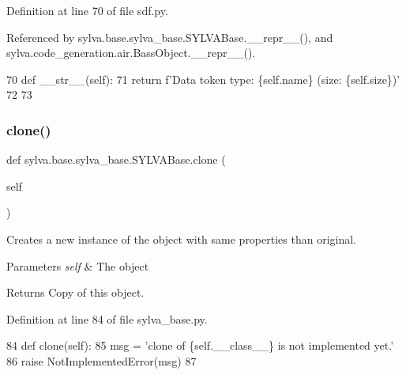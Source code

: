 Definition at line 70 of file sdf.\+py.



Referenced by sylva.\+base.\+sylva\+\_\+base.\+S\+Y\+L\+V\+A\+Base.\+\_\+\+\_\+repr\+\_\+\+\_\+(), and sylva.\+code\+\_\+generation.\+air.\+Bass\+Object.\+\_\+\+\_\+repr\+\_\+\+\_\+().


\begin{DoxyCode}
70     \textcolor{keyword}{def }\_\_str\_\_(self):
71         \textcolor{keywordflow}{return} f\textcolor{stringliteral}{'Data token type: \{self.name\} (size: \{self.size\})'}
72 
73 
\end{DoxyCode}
\mbox{\label{classsylva_1_1base_1_1sylva__base_1_1_s_y_l_v_a_base_a1597b4594cb73e0fa2597742239660f5}} 
\subsubsection{\texorpdfstring{clone()}{clone()}}
{\footnotesize\ttfamily def sylva.\+base.\+sylva\+\_\+base.\+S\+Y\+L\+V\+A\+Base.\+clone (\begin{DoxyParamCaption}\item[{}]{self }\end{DoxyParamCaption})\hspace{0.3cm}{\ttfamily [inherited]}}



Creates a new instance of the object with same properties than original. 


\begin{DoxyParams}{Parameters}
{\em self} & The object\\
\hline
\end{DoxyParams}
\begin{DoxyReturn}{Returns}
Copy of this object. 
\end{DoxyReturn}


Definition at line 84 of file sylva\+\_\+base.\+py.


\begin{DoxyCode}
84     \textcolor{keyword}{def }clone(self):
85         msg = \textcolor{stringliteral}{'clone of \{self.\_\_class\_\_\} is not implemented yet.'}
86         \textcolor{keywordflow}{raise} NotImplementedError(msg)
87 \end{DoxyCode}
\mbox{\label{classsylva_1_1base_1_1sdf_1_1_data_token_type_a24c66d6a5350bf4d8e6bcdaa64202c7c}} 
